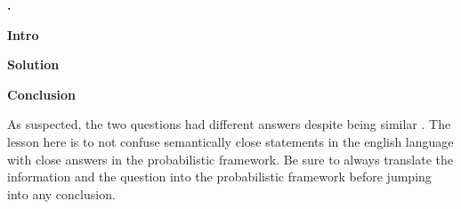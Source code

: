 \documentclass[a4paper,10pt]{book}
\begin{document}
\textbf{.}

\textbf{Intro} \par
\par


\textbf{Solution} \par


\textbf{Conclusion} \par
As suspected, the two questions had different answers despite being similar . The lesson here is
to not confuse semantically close statements in the english language with close answers in
the probabilistic framework. Be sure to always translate the information and the question into
the probabilistic framework before jumping into any conclusion.
\end{document}
